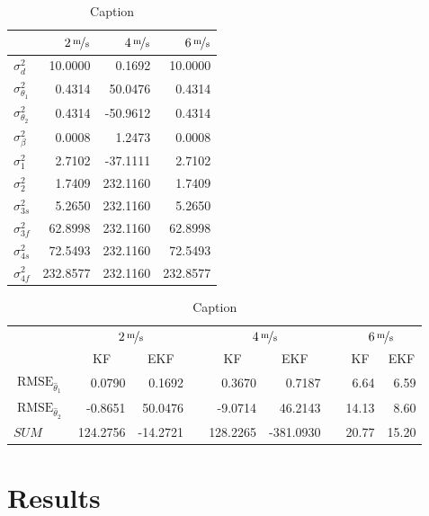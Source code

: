 \newcommand{\ra}[1]{\renewcommand{\arraystretch}{#1}}
\begin{table}\centering
\ra{1.3}
\begin{tabular}{@{}lrrr@{}}\toprule
 & $\unitfrac[2]{m}{s}$ & $\unitfrac[4]{m}{s}$ & $\unitfrac[6]{m}{s}$ \\
\midrule
$\sigma^2_d$ & 10.0000 & 0.1692 & 10.0000 \\
$\sigma^2_{\theta_1}$ & 0.4314 & 50.0476& 0.4314 \\
$\sigma^2_{\theta_2}$ & 0.4314 & -50.9612& 0.4314 \\
$\sigma^2_{\beta}$ & 0.0008 & 1.2473& 0.0008 \\
$\sigma^2_1$ & 2.7102 & -37.1111& 2.7102 \\
$\sigma^2_2$ & 1.7409 & 232.1160& 1.7409 \\
$\sigma^2_{3s}$ & 5.2650 & 232.1160& 5.2650 \\
$\sigma^2_{3f}$ & 62.8998 & 232.1160& 62.8998 \\
$\sigma^2_{4s}$ & 72.5493 & 232.1160& 72.5493 \\
$\sigma^2_{4f}$ & 232.8577 & 232.1160& 232.8577 \\
\bottomrule
\end{tabular}
\caption{Caption}
\end{table}


\begin{table}\centering
\ra{1.3}
\begin{tabular}{@{}lrrcrrcrr@{}}\toprule
& \multicolumn{2}{c}{$\unitfrac[2]{m}{s}$} & \phantom{abc} & \multicolumn{2}{c}{$\unitfrac[4]{m}{s}$} &
\phantom{abc} & \multicolumn{2}{c}{$\unitfrac[6]{m}{s}$}\\ \cmidrule{2-3} \cmidrule{5-6} \cmidrule{8-9}
& \multicolumn{1}{c}{KF} & \multicolumn{1}{c}{EKF} &&  \multicolumn{1}{c}{KF} & \multicolumn{1}{c}{EKF} &&  \multicolumn{1}{c}{KF} & \multicolumn{1}{c}{EKF} \\ \midrule
$\operatorname{RMSE}_{\hat{\theta}_1}$ & 0.0790 & 0.1692 && 0.3670 & 0.7187 && 6.64 & 6.59 \\
$\operatorname{RMSE}_{\hat{\theta}_2}$ & -0.8651 & 50.0476 && -9.0714 & 46.2143 && 14.13 & 8.60\\
$SUM$ & 124.2756 & -14.2721 && 128.2265 & -381.0930 && 20.77 & 15.20 \\ \bottomrule
\end{tabular}
\caption{Caption}
\end{table}


\section{Results}

